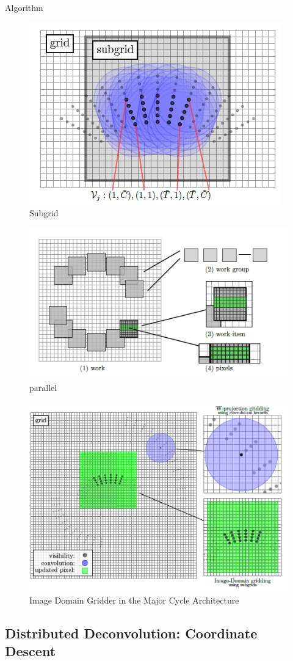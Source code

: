 Algorithm
\begin{figure}[h]
	\centering
	\includegraphics[width=0.40\linewidth]{./chapters/03.distribution/idg/subgrid.png}
	\caption{Subgrid}
	\label{distribution:idg:subgrid}
\end{figure}

\begin{figure}[h]
	\centering
	\includegraphics[width=0.40\linewidth]{./chapters/03.distribution/idg/paralellization.png}
	\caption{parallel}
	\label{distribution:idg:parallel}
\end{figure}

\begin{figure}[h]
	\centering
	\includegraphics[width=0.40\linewidth]{./chapters/03.distribution/idg/idg0.png}
	\caption{Image Domain Gridder in the Major Cycle Architecture}
	\label{distribution:idg:idg0}
\end{figure}



\subsection{Distributed Deconvolution: Coordinate Descent}

